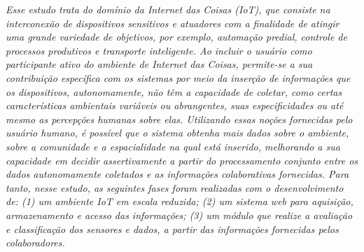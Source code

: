 \emph{
Esse estudo trata do domínio da Internet das Coisas (IoT), que consiste na interconexão de dispositivos
 sensitivos e atuadores com a finalidade de atingir uma grande variedade de objetivos, por exemplo, automação predial, controle de processos produtivos e transporte inteligente. %
 Ao incluir o usuário como participante ativo do ambiente de Internet das Coisas,
 permite-se a sua contribuição específica com os sistemas por meio da inserção de informações que os
  dispositivos, autonomamente, não têm a capacidade de coletar,
 como certas características ambientais variáveis ou abrangentes, suas especificidades ou até
  mesmo as percepções humanas sobre elas.
  Utilizando essas noções fornecidas pelo usuário humano, é possível que o sistema obtenha mais
  dados sobre o ambiente, sobre a comunidade e a espacialidade na qual está inserido, melhorando
  a sua capacidade em decidir assertivamente a partir do processamento conjunto entre os dados autonomamente
  coletados e as informações colaborativas fornecidas.
  Para tanto, nesse estudo, as seguintes fases foram realizadas com o desenvolvimento de: (1) um ambiente IoT em escala reduzida;
  (2) um sistema web para aquisição, armazenamento e acesso das informações;
  (3) um módulo que realize a avaliação e classificação dos sensores e dados,
  a partir das informações fornecidas pelos colaboradores.
}
